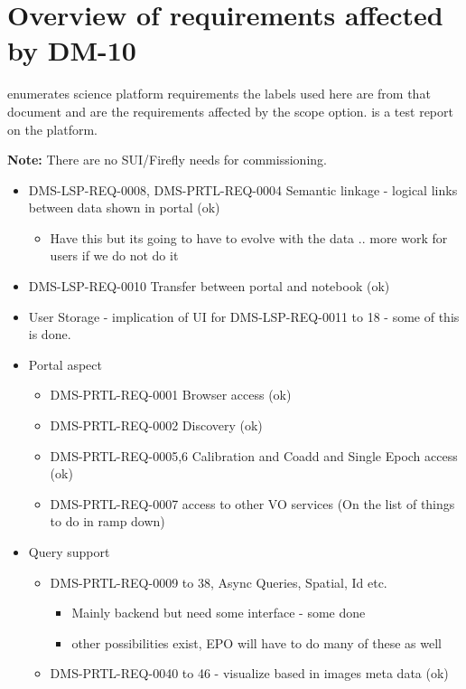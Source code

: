 \section { Overview of requirements affected by DM-10}\label{sect:reqs}
 enumerates science platform requirements the labels used here are from that document and are the requirements affected by the scope option.
 is a test report on the platform.

 {\bf Note:} There are no SUI/Firefly needs for commissioning.
\begin{itemize}
\item  DMS-LSP-REQ-0008, DMS-PRTL-REQ-0004 Semantic linkage - logical links between data shown in portal (ok)
\begin{itemize}
\item Have this but its going to have to evolve with the data .. more work for users if we do not do it
\end{itemize}

\item  DMS-LSP-REQ-0010 Transfer between portal and notebook (ok)
\item  User Storage - implication of UI for DMS-LSP-REQ-0011 to 18 - some of this is done.
\item  Portal aspect
\begin{itemize}
\item  DMS-PRTL-REQ-0001 Browser access (ok)
\item DMS-PRTL-REQ-0002 Discovery (ok)
\item DMS-PRTL-REQ-0005,6 Calibration and Coadd and Single Epoch access (ok)
\item DMS-PRTL-REQ-0007 access to other VO services (On the list of things to do in ramp down)
\end{itemize}

\item Query support
\begin{itemize}
\item  DMS-PRTL-REQ-0009 to 38, Async Queries, Spatial, Id etc.
\begin{itemize}
\item Mainly backend but need some interface - some done
\item other possibilities exist, EPO will have to do many of these as well
\end{itemize}
\item DMS-PRTL-REQ-0040 to 46 - visualize based in images meta data (ok)
\end{itemize}



\end{itemize}
